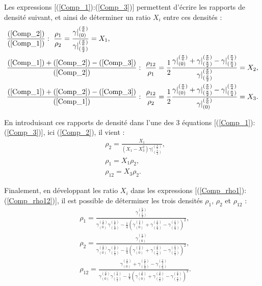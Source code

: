 \documentclass[12pt]{report}
\begin{document}
    Les expressions [(\ref{Comp_1}):(\ref{Comp_3})] permettent d'écrire les rapports de densité suivant, et ainsi de déterminer un ratio $X_i$ entre ces densités :
    \begin{align}
    &\frac{(\ref{Comp_2})}{(\ref{Comp_1})} :\ \frac{\rho_1}{\rho_2}=\frac{\gamma|^{(\frac{\pi}{6})}_{(0)}}{\gamma|^{(\frac{\pi}{6})}_{(\frac{\pi}{2})}}=X_1,\label{Comp_rho2_rho1} \\
    &\frac{(\ref{Comp_1})+(\ref{Comp_2})-(\ref{Comp_3})}{(\ref{Comp_2})} :\ \frac{\rho_{12}}{\rho_1}=\frac{1}{2}\frac{\gamma|^{(\frac{\pi}{6})}_{(0)}+\gamma|^{(\frac{\pi}{6})}_{(\frac{\pi}{2})}-\gamma|^{(\frac{\pi}{4})}_{(\frac{\pi}{4})}}{\gamma|^{(\frac{\pi}{6})}_{(\frac{\pi}{2})}}=X_2,\label{Comp_rho12_rho1} \\
    &\frac{(\ref{Comp_1})+(\ref{Comp_2})-(\ref{Comp_3})}{(\ref{Comp_1})} :\ \frac{\rho_{12}}{\rho_2}=\frac{1}{2}\frac{\gamma|^{(\frac{\pi}{6})}_{(0)}+\gamma|^{(\frac{\pi}{6})}_{(\frac{\pi}{2})}-\gamma|^{(\frac{\pi}{4})}_{(\frac{\pi}{4})}}{\gamma|^{(\frac{\pi}{6})}_{(0)}}=X_3.\label{Comp_rho12_rho2}
    \end{align}
    
    En introduisant ces rapports de densité dans l'une des 3 équations [(\ref{Comp_1}):(\ref{Comp_3})], ici (\ref{Comp_2}), il vient : 
    \begin{align}
    &\rho_2=\frac{X_1}{(X_1-X_3^2)\gamma|^{(\frac{\pi}{6})}_{(\frac{\pi}{2})}},\label{Comp_rho2}\\
    &\rho_1=X_1\rho_2,\label{Comp_rho1}\\
    &\rho_{12}=X_3\rho_2.\label{Comp_rho12}
    \end{align}
    
    Finalement, en développant les ratio $X_i$ dans les expressions [(\ref{Comp_rho1}):(\ref{Comp_rho12})], il est possible de déterminer les trois densités $\rho_1$, $\rho_2$ et $\rho_{12}$ :
    \begin{align}
        &\rho_1=\frac{\gamma^{(\frac{\pi}{6})}_{(\frac{\pi}{2})}}{\gamma^{(\frac{\pi}{6})}_{(0)}\gamma^{(\frac{\pi}{6})}_{(\frac{\pi}{2})}-\frac{1}{4}(\gamma^{(\frac{\pi}{6})}_{(0)}+\gamma^{(\frac{\pi}{6})}_{(\frac{\pi}{2})}-\gamma^{(\frac{\pi}{4})}_{(\frac{\pi}{4})})^2},\label{rho1}\\
        &\rho_2=\frac{\gamma^{(\frac{\pi}{6})}_{(0)}}{\gamma^{(\frac{\pi}{6})}_{(0)}\gamma^{(\frac{\pi}{6})}_{(\frac{\pi}{2})}-\frac{1}{4}(\gamma^{(\frac{\pi}{6})}_{(0)}+\gamma^{(\frac{\pi}{6})}_{(\frac{\pi}{2})}-\gamma^{(\frac{\pi}{4})}_{(\frac{\pi}{4})})^2},\label{rho2}\\
        &\rho_{12}=\frac{\gamma^{(\frac{\pi}{6})}_{(0)}+\gamma^{(\frac{\pi}{6})}_{(\frac{\pi}{2})}-\gamma^{(\frac{\pi}{4})}_{(\frac{\pi}{4})}}{\gamma^{(\frac{\pi}{6})}_{(0)}\gamma^{(\frac{\pi}{6})}_{(\frac{\pi}{2})}-\frac{1}{4}(\gamma^{(\frac{\pi}{6})}_{(0)}+\gamma^{(\frac{\pi}{6})}_{(\frac{\pi}{2})}-\gamma^{(\frac{\pi}{4})}_{(\frac{\pi}{4})})^2}.\label{rho12}
    \end{align}
\end{document}
